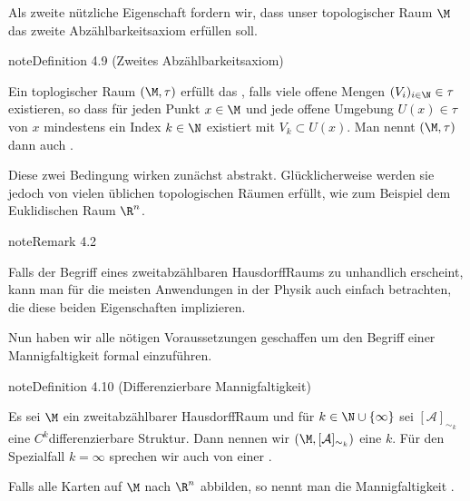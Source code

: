 \documentclass[letterpaper,10pt,german]{jupyterBook}
\begin{document}
\sphinxAtStartPar
Als zweite nützliche Eigenschaft fordern wir, dass unser topologischer Raum \(\M\) das zweite Abzählbarkeitsaxiom erfüllen soll.
\label{manifolds/manifolds_prelim:definition-11}
\begin{sphinxadmonition}{note}{Definition 4.9 (Zweites Abzählbarkeitsaxiom)}



\sphinxAtStartPar
Ein toplogischer Raum \((\M, \tau)\) erfüllt das , falls  viele offene Mengen \((V_i)_{i\in\N} \in \tau\) existieren, so dass für jeden Punkt \(x\in \M\) und jede offene Umgebung \(U(x) \in \tau\) von \(x\) mindestens ein Index \(k\in\N\) existiert mit \(V_k \subset U(x)\).
Man nennt \((\M, \tau)\) dann auch .
\end{sphinxadmonition}

\sphinxAtStartPar
Diese zwei Bedingung wirken zunächst abstrakt.
Glücklicherweise werden sie jedoch von vielen üblichen topologischen Räumen erfüllt, wie zum Beispiel dem Euklidischen Raum \(\R^n\).
\label{manifolds/manifolds_prelim:remark-12}
\begin{sphinxadmonition}{note}{Remark 4.2}



\sphinxAtStartPar
Falls der Begriff eines zweitabzählbaren Hausdorff\sphinxhyphen{}Raums zu unhandlich erscheint, kann man für die meisten Anwendungen in der Physik auch einfach  betrachten, die diese beiden Eigenschaften implizieren.
\end{sphinxadmonition}

\sphinxAtStartPar
Nun haben wir alle nötigen Voraussetzungen geschaffen um den Begriff einer Mannigfaltigkeit formal einzuführen.
\label{manifolds/manifolds_prelim:definition-13}
\begin{sphinxadmonition}{note}{Definition 4.10 (Differenzierbare Mannigfaltigkeit)}



\sphinxAtStartPar
Es sei \(\M\) ein zweitabzählbarer Hausdorff\sphinxhyphen{}Raum und für \(k\in\N\cup \{\infty\}\) sei \([\mathcal{A}]_{\sim_k}\) eine \(C^k\)\sphinxhyphen{}differenzierbare Struktur.
Dann nennen wir \((\M,[\mathcal{A}]_{\sim_k})\) eine \(k\)\sphinxhyphen{}.
Für den Spezialfall \(k=\infty\) sprechen wir auch von einer .

\sphinxAtStartPar
Falls alle Karten auf \(\M\) nach \(\R^n\) abbilden, so nennt man die Mannigfaltigkeit .
\end{sphinxadmonition}
\end{document}
